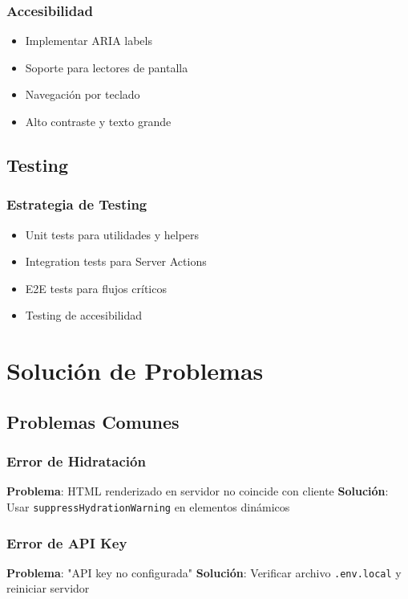 \documentclass[12pt,a4paper]{article}
\begin{document}
\subsubsection{Accesibilidad}
\begin{itemize}
    \item Implementar ARIA labels
    \item Soporte para lectores de pantalla
    \item Navegación por teclado
    \item Alto contraste y texto grande
\end{itemize}

\subsection{Testing}

\subsubsection{Estrategia de Testing}
\begin{itemize}
    \item Unit tests para utilidades y helpers
    \item Integration tests para Server Actions
    \item E2E tests para flujos críticos
    \item Testing de accesibilidad
\end{itemize}

\section{Solución de Problemas}

\subsection{Problemas Comunes}

\subsubsection{Error de Hidratación}
\textbf{Problema}: HTML renderizado en servidor no coincide con cliente
\textbf{Solución}: Usar \texttt{suppressHydrationWarning} en elementos dinámicos

\subsubsection{Error de API Key}
\textbf{Problema}: "API key no configurada"
\textbf{Solución}: Verificar archivo \texttt{.env.local} y reiniciar servidor
\end{document}
